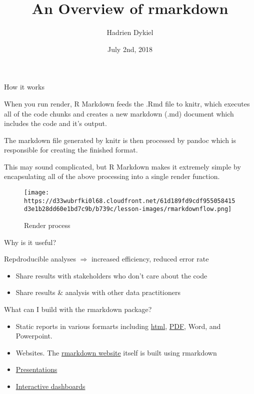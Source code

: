 \documentclass[ignorenonframetext,]{beamer}
\title{An Overview of rmarkdown}
\author{Hadrien Dykiel}
\date{July 2nd, 2018}
\providecommand{\tightlist}{%
  \setlength{\itemsep}{0pt}\setlength{\parskip}{0pt}}
\begin{document}
\frame{\titlepage}

\begin{frame}{How it works}
\protect\hypertarget{how-it-works}{}

When you run render, R Markdown feeds the .Rmd file to knitr, which
executes all of the code chunks and creates a new markdown (.md)
document which includes the code and it's output.

The markdown file generated by knitr is then processed by pandoc which
is responsible for creating the finished format.

This may sound complicated, but R Markdown makes it extremely simple by
encapsulating all of the above processing into a single render function.

\begin{figure}
\centering
\texttt{[image: https://d33wubrfki0l68.cloudfront.net/61d189fd9cdf955058415d3e1b28dd60e1bd7c9b/b739c/lesson-images/rmarkdownflow.png]}
\caption{Render process}
\end{figure}

\end{frame}

\begin{frame}{Why is it useful?}
\protect\hypertarget{why-is-it-useful}{}

Repdroducible analyses \(\Longrightarrow\) increased efficiency, reduced
error rate

\begin{itemize}
\tightlist
\item
  Share results with stakeholders who don't care about the code
\item
  Share results \& analysis with other data practitioners
\end{itemize}

\end{frame}

\begin{frame}{What can I build with the rmarkdown package?}
\protect\hypertarget{what-can-i-build-with-the-rmarkdown-package}{}

\begin{itemize}
\tightlist
\item
  Static reports in various formarts including
  \href{http://colorado.rstudio.com/rsc/content/1129/report.html\%22}{html},
  \href{http://colorado.rstudio.com/rsc/content/1081/parameterized-happiness.pdf}{PDF},
  Word, and Powerpoint.
\item
  Websites. The \href{https://rmarkdown.rstudio.com/}{rmarkdown website}
  itself is built using rmarkdown
\item
  \href{http://svmiller.com/rmarkdown-example.pdf}{Presentations}
\item
  \href{https://gallery.shinyapps.io/cran-gauge/}{Interactive
  dashboards}
\end{itemize}

\end{frame}
\end{document}
